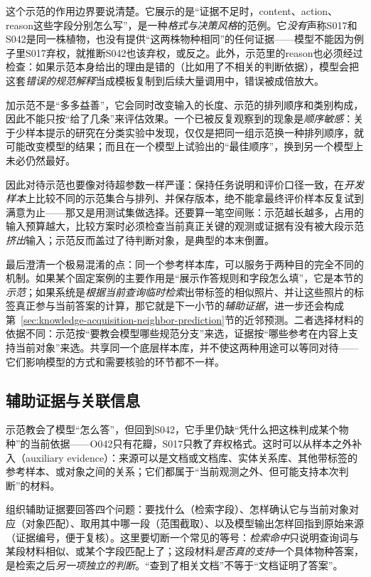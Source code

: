 这个示范的作用边界要说清楚。它展示的是“证据不足时，content、action、reason这些字段分别怎么写”，是一种\emph{格式与决策风格}的范例。它\emph{没有}声称S017和S042是同一株植物，也没有提供“这两株物种相同”的任何证据——模型不能因为例子里S017弃权，就推断S042也该弃权，或反之。此外，示范里的reason也必须经过检查：如果示范本身给出的理由是错的（比如用了不相关的判断依据），模型会把这套\emph{错误的规范解释}当成模板复制到后续大量调用中，错误被成倍放大。

加示范不是“多多益善”，它会同时改变输入的长度、示范的排列顺序和类别构成，因此不能只按“给了几条”来评估效果。一个已被反复观察到的现象是\emph{顺序敏感}：关于少样本提示的研究在分类实验中发现，仅仅是把同一组示范换一种排列顺序，就可能改变模型的结果；而且在一个模型上试验出的“最佳顺序”，换到另一个模型上未必仍然最好。

因此对待示范也要像对待超参数一样严谨：保持任务说明和评价口径一致，在\emph{开发样本}上比较不同的示范集合与排列、并保存版本，绝不能拿最终评价样本反复试到满意为止——那又是用测试集做选择。还要算一笔空间账：示范越长越多，占用的输入预算越大，比较方案时必须检查当前真正关键的观测或证据有没有被大段示范\emph{挤出}输入；示范反而盖过了待判断对象，是典型的本末倒置。

最后澄清一个极易混淆的点：同一个参考样本库，可以服务于两种目的完全不同的机制。如果某个固定案例的主要作用是“展示作答规则和字段怎么填”，它是本节的\emph{示范}；如果系统是\emph{根据当前查询临时检索}出带标签的相似照片、并让这些照片的标签真正参与当前答案的计算，那它就是下一小节的\emph{辅助证据}，进一步还会构成第~\ref{sec:knowledge-acquisition-neighbor-prediction}节的近邻预测。二者选择材料的依据不同：示范按“要教会模型哪些规范分支”来选，证据按“哪些参考在内容上支持当前对象”来选。共享同一个底层样本库，并不使这两种用途可以等同对待——它们影响模型的方式和需要核验的环节都不一样。

\subsection{辅助证据与关联信息}
\label{sec:knowledge-acquisition-auxiliary-evidence}

示范教会了模型“怎么答”，但回到S042，它手里仍缺“凭什么把这株判成某个物种”的当前依据——O042只有花瓣，S017只教了弃权格式。这时可以从样本之外补入（auxiliary evidence）：来源可以是文档或文档库、实体关系库、其他带标签的参考样本、或对象之间的关系；它们都属于“当前观测之外、但可能支持本次判断”的材料。

组织辅助证据要回答四个问题：要找什么（检索字段）、怎样确认它与当前对象对应（对象匹配）、取用其中哪一段（范围截取）、以及模型输出怎样回指到原始来源（证据编号，便于复核）。这里要切断一个常见的等号：\emph{检索命中}只说明查询词与某段材料相似、或某个字段匹配上了；这段材料\emph{是否真的支持}一个具体物种答案，是检索之后\emph{另一项独立的判断}。“查到了相关文档”不等于“文档证明了答案”。

